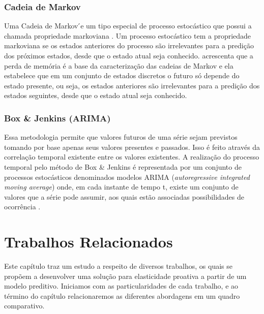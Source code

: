 \documentclass[twoside,english,brazilian]{UNISINOSmonografia}
\begin{document}

\subsection{Cadeia de Markov}
Uma Cadeia de Markov ́e um tipo especial de processo estocástico que possui a chamada propriedade markoviana . Um processo estocástico tem a propriedade markoviana se os estados anteriores do processo são irrelevantes para a predição dos próximos estados, desde que o estado atual seja conhecido. 
\citep{Junior2011} acrescenta que a perda de memória é a base da caracterização das cadeias de Markov e ela estabelece que em um conjunto de estados discretos o futuro só depende do estado presente, ou seja, os estados anteriores são irrelevantes para a predição dos estados seguintes, desde que o estado atual seja conhecido.


\subsection{Box & Jenkins (ARIMA)}
Essa metodologia permite que valores futuros de uma série sejam previstos tomando por base apenas seus valores presentes e passados. Isso é feito através da correlação temporal existente entre os valores existentes. A realização do processo temporal pelo método de Box & Jenkins é representada por um conjunto de processos estocásticos denominados modelos ARIMA (\textit{autoregressive integrated moving average}) onde, em cada instante de tempo t, existe um conjunto de valores que a série pode assumir, aos quais estão associadas possibilidades de ocorrência \citep{Silva2005}. 


\chapter{Trabalhos Relacionados}
Este capítulo traz um estudo a respeito de diversos trabalhos, os quais se propõem a desenvolver uma solução para elasticidade proativa a partir de um modelo preditivo. Iniciamos com as particularidades de cada trabalho, e ao término do capítulo relacionaremos as diferentes abordagens em um quadro comparativo.
\end{document}
